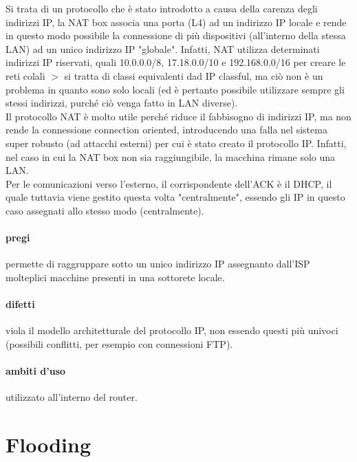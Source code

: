\documentclass{article}
\begin{document}
Si trata di un protocollo che è stato introdotto a causa della carenza degli
indirizzi IP, la NAT box associa una porta (L4) ad un indirizzo IP locale e
rende in questo modo possibile la connessione di più dispositivi (all'interno
della stessa LAN) ad un unico indirizzo IP "globale". Infatti, NAT utilizza
determinati indirizzi IP riservati, quali 10.0.0.0/8, 17.18.0.0/10 e
192.168.0.0/16 per creare le reti colali $>$ si tratta di classi equivalenti dad
IP classful, ma ciò non è un problema in quanto sono solo locali (ed è pertanto
possibile utilizzare sempre gli stessi indirizzi, purché ciò venga fatto in LAN
diverse).\\
Il protocollo NAT è molto utile perché riduce il fabbisogno di indirizzi IP, ma
non rende la connessione connection oriented, introducendo una falla nel sistema
super robusto (ad attacchi esterni) per cui è stato creato il protocollo IP.
Infatti, nel caso in cui la NAT box non sia raggiungibile, la macchina rimane
solo una LAN.\\
Per le comunicazioni verso l'esterno, il corrispondente dell'ACK è il DHCP, il
quale tuttavia viene gestito questa volta "centralmente", essendo gli IP in
questo caso assegnati allo stesso modo (centralmente).

\paragraph{pregi} permette di raggruppare sotto un unico indirizzo IP assegnanto
dall'ISP molteplici macchine presenti in una sottorete locale.

\paragraph{difetti} viola il modello architetturale del protocollo IP, non
essendo questi più univoci (possibili conflitti, per esempio con connessioni
FTP).

\paragraph{ambiti d'uso} utilizzato all'interno del router.

\section{Flooding}
\end{document}
